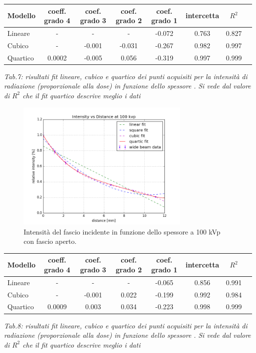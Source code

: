 \documentclass[a4paper]{article}
\begin{document}
\begin{center} 
		
		\begin{tabular}{lccccccc}
			\hline
			\hline
			\textbf{Modello}	& \textbf{coeff. grado 4}&\textbf{coef. grado 3}&\textbf{coef. grado 2}& \textbf{coef. grado 1}& \textbf{intercetta}&  \textbf{$R^{2}$} 	 \\
			\hline
			\hline
			Lineare	&-&-&-&-0.072&0.763&0.827	\\
			Cubico	&-&-0.001&-0.031&-0.267&0.982&0.997\\
			Quartico &0.0002&-0.005&0.056&-0.319&0.997&0.999\\
			
			\hline
			\hline
		\end{tabular}
		\linebreak
		\emph{Tab.7: risultati fit lineare, cubico e quartico  dei punti acquisiti per la intensità di radiazione (proporzionale alla dose) in funzione dello spessore . Si vede dal valore di $R^{2}$ che il fit quartico descrive meglio i dati} 
	\end{center} 


\begin{figure}[H]
\centering
\includegraphics[width=0.75\textwidth]{hvl100pvkwide.png}
\caption{Intensità del fascio incidente in funzione dello spessore a 100 kVp con fascio aperto.}
\end{figure}

\begin{center} 
		
		\begin{tabular}{lccccccc}
			\hline
			\hline
			\textbf{Modello}	& \textbf{coeff. grado 4}&\textbf{coef. grado 3}&\textbf{coef. grado 2}& \textbf{coef. grado 1}& \textbf{intercetta}&  \textbf{$R^{2}$} 	 \\
			\hline
			\hline
			Lineare	&-&-&-&-0.065&0.856&0.991	\\
			Cubico	&-&-0.001&0.022&-0.199&0.992&0.984\\
			Quartico &0.0009&0.003&0.034&-0.223&0.998&0.999\\
			
			\hline
			\hline
		\end{tabular}
		\linebreak
		\emph{Tab.8: risultati fit lineare, cubico e quartico  dei punti acquisiti per la intensità di radiazione (proporzionale alla dose) in funzione dello spessore . Si vede dal valore di $R^{2}$ che il fit quartico descrive meglio i dati} 
	\end{center} 
\end{document}
